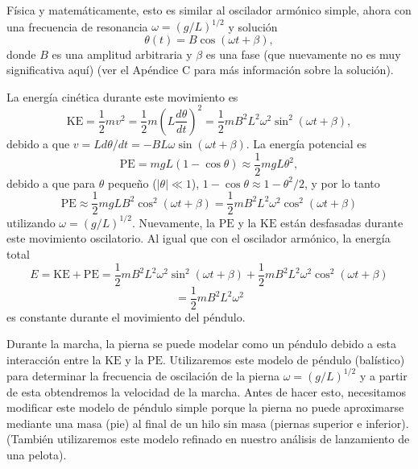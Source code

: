 \documentclass[12pt]{book}
\begin{document}
Física y matemáticamente, esto es similar al oscilador armónico simple, ahora con una frecuencia de resonancia $\omega = (g/L)^{1/2}$ y solución
\begin{equation}
\theta(t) = B \cos(\omega t + \beta),
\label{eq:3.15}
\end{equation}
donde $B$ es una amplitud arbitraria y $\beta$ es una fase (que nuevamente no es muy significativa aquí) (ver el Apéndice C para más información sobre la solución).

La energía cinética durante este movimiento es
\begin{equation}
\text{KE} = \frac{1}{2} m v^2 = \frac{1}{2} m \left( L \frac{d\theta}{dt} \right)^2 = \frac{1}{2} m B^2 L^2 \omega^2 \sin^2(\omega t + \beta),
\label{eq:3.16}
\end{equation}
debido a que $v = L d\theta/dt = -B L \omega \sin(\omega t + \beta)$. La energía potencial es
\begin{equation}
\text{PE} = m g L (1 - \cos\theta) \approx \frac{1}{2} m g L \theta^2,
\label{eq:3.17}
\end{equation}
debido a que para $\theta$ pequeño ($|\theta| \ll 1$), $1 - \cos\theta \approx 1 - \theta^2/2$, y por lo tanto
\begin{equation}
\text{PE} \approx \frac{1}{2} m g L B^2 \cos^2(\omega t + \beta) = \frac{1}{2} m B^2 L^2 \omega^2 \cos^2(\omega t + \beta)
\label{eq:3.18}
\end{equation}
utilizando $\omega = (g/L)^{1/2}$. Nuevamente, la $\text{PE}$ y la $\text{KE}$ están desfasadas durante este movimiento oscilatorio. Al igual que con el oscilador armónico, la energía total
\begin{equation}
E = \text{KE} + \text{PE} = \frac{1}{2} m B^2 L^2 \omega^2 \sin^2(\omega t + \beta) + \frac{1}{2} m B^2 L^2 \omega^2 \cos^2(\omega t + \beta)
\label{eq:3.19}
\end{equation}
\begin{equation}
= \frac{1}{2} m B^2 L^2 \omega^2
\label{eq:3.20}
\end{equation}
es constante durante el movimiento del péndulo.

Durante la marcha, la pierna se puede modelar como un péndulo debido a esta interacción entre la $\text{KE}$ y la $\text{PE}$. Utilizaremos este modelo de péndulo (balístico) para determinar la frecuencia de oscilación de la pierna $\omega = (g/L)^{1/2}$ y a partir de esta obtendremos la velocidad de la marcha. Antes de hacer esto, necesitamos modificar este modelo de péndulo simple porque la pierna no puede aproximarse mediante una masa (pie) al final de un hilo sin masa (piernas superior e inferior). (También utilizaremos este modelo refinado en nuestro análisis de lanzamiento de una pelota).
\end{document}
